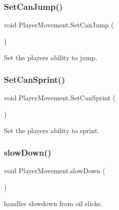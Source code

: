 \subsubsection{\texorpdfstring{Set\+Can\+Jump()}{SetCanJump()}}
{\footnotesize\ttfamily void Player\+Movement.\+Set\+Can\+Jump (\begin{DoxyParamCaption}{ }\end{DoxyParamCaption})}



Set the player\textquotesingle{}s ability to jump. 

\mbox{\label{class_player_movement_a6eca87a71348040e0eedb138eb1c3a0c}} 
\subsubsection{\texorpdfstring{Set\+Can\+Sprint()}{SetCanSprint()}}
{\footnotesize\ttfamily void Player\+Movement.\+Set\+Can\+Sprint (\begin{DoxyParamCaption}{ }\end{DoxyParamCaption})}



Set the player\textquotesingle{}s ability to sprint. 

\mbox{\label{class_player_movement_a688ef83dd4792fdb5bcf76195b7f2fae}} 
\subsubsection{\texorpdfstring{slow\+Down()}{slowDown()}}
{\footnotesize\ttfamily void Player\+Movement.\+slow\+Down (\begin{DoxyParamCaption}{ }\end{DoxyParamCaption})}



handles slowdown from oil slicks. 

\mbox{\label{class_player_movement_a323e163d04bd2b048ca8d17510cfe299}} 
